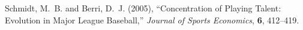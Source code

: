 \documentclass[11pt]{article}\usepackage[]{graphicx}\usepackage[]{color}
\begin{document}
\begin{FlushLeft}
\begin{thebibliography}{00}




Schmidt, M.~B. and Berri, D.~J. (2005),
\newblock ``Concentration of Playing Talent: Evolution in Major League Baseball,''
\newblock \emph{Journal of Sports Economics}, {\bf 6}, 412--419.





\end{thebibliography}
\end{FlushLeft}
\end{document}
